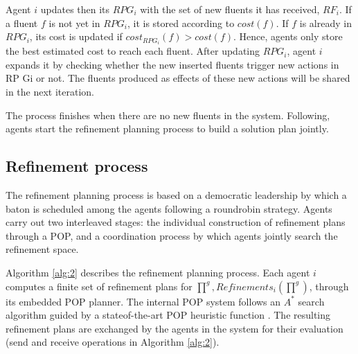 \documentclass[12pt]{article}
\begin{document}
Agent $i$ updates then its $RPG_i$ with the set of new fluents it has received, $RF_i$. If a fluent $f$ is not yet in $RPG_i$, it is stored according to $cost(f)$. If $f$ is already in $RPG_i$, its cost is updated if $cost_{RPG_i}(f) > cost(f)$. Hence, agents only store the best estimated cost to reach each fluent. After updating $RPG_i$, agent $i$ expands it by checking whether the new inserted fluents trigger new actions in RP Gi or not. The fluents produced as effects of these new actions will be shared in the next iteration.

The process finishes when there are no new fluents in the system. Following, agents start the refinement planning process to build a solution plan jointly.

\subsection{Refinement process}

The refinement planning process is based on a democratic leadership by which a baton is scheduled among the agents following a roundrobin strategy. Agents carry out two interleaved stages: the individual construction of refinement plans through a POP, and a coordination process by which agents jointly search the refinement space.

Algorithm \ref{alg:2} describes the refinement planning process. Each agent $i$ computes a finite set of refinement plans for $\prod^g, Refinements_i(\prod^g)$, through its embedded POP planner. The internal POP system follows an $A^\ast$ search algorithm guided by a stateof-the-art POP heuristic function \cite{Younes2003VHPOPVH}. The resulting refinement plans are exchanged by the agents in the system for their evaluation (send and receive operations in Algorithm \ref{alg:2}).
\end{document}
